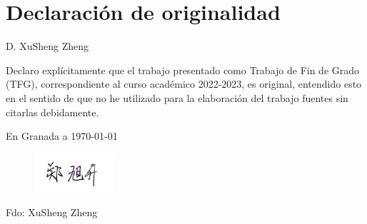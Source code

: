%
\chapter*{Declaración de originalidad}

D. XuSheng Zheng

Declaro explícitamente que el trabajo presentado como Trabajo de Fin de Grado (TFG), correspondiente al curso académico 2022-2023, es original, entendido esto en el sentido de que no he utilizado para la elaboración del trabajo fuentes sin citarlas debidamente.
\medskip

En Granada a \today 
\begin{flushleft} 
\begin{figure}[H]
    \includegraphics[width=3cm]{img/firma.png}
\end{figure}
Fdo: XuSheng Zheng

\end{flushleft}

\vfill

\endinput
